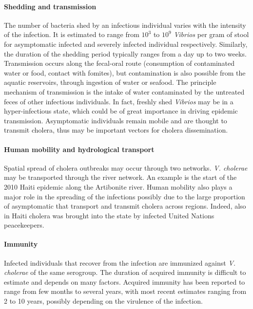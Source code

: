 \paragraph{Shedding and transmission} The number of bacteria shed by an infectious individual varies with the intensity of the infection. It is estimated to range from $10^3$ to $10^{9}$ \textit{Vibrios} per gram of stool for asymptomatic infected and severely infected individual respectively. Similarly, the duration of the shedding period typically ranges from a day up to two weeks.
Transmission occurs along the fecal-oral route (consumption of contaminated water or food, contact with fomites), but contamination is also possible from the aquatic reservoirs, through ingestion of water or seafood. The principle mechanism of transmission is the intake of water contaminated by the untreated feces of other infectious individuals. In fact, freshly shed \textit{Vibrios} may be in a hyper-infectious state, which could be of great importance in driving epidemic transmission\cite{Butler:CholeraStoolBacteria:2006}.
Asymptomatic individuals remain mobile and are thought to transmit cholera, thus may be important vectors for cholera dissemination.
\paragraph{Human mobility and hydrological transport} Spatial spread of cholera outbreaks may occur through two networks. \textit{V. cholerae} may be transported through the river network. An example is the start of the 2010 Haiti epidemic along the Artibonite river\cite{Piarroux:UnderstandingCholeraEpidemic:2011}. Human mobility also plays a major role in the spreading of the infections possibly due to the large proportion of asymptomatic that transport and transmit cholera across regions. Indeed, also in Haiti cholera was brought into the state by infected United Nations peacekeepers\cite{Piarroux:UnderstandingCholeraEpidemic:2011}. %

\paragraph{Immunity} Infected individuals that recover from the infection are immunized against \textit{V. cholerae}  of the same serogroup. The duration of acquired immunity is difficult to estimate and depends on many factors. Acquired immunity has been reported to range from few months to several years, with most recent estimates ranging from 2 to 10 years, possibly depending on the virulence of the infection\cite{Levine:DurationInfectionDerivedImmunity:1981,Kaper:Cholera:1995,Woodward:CholeraReinfectionMan:1971,Glass:SeroepidemiologicalStudiesEI:1985,Clemens:BiotypeDeterminantNatural:1991,Leung:ProtectionAffordedPrevious:2021}.

